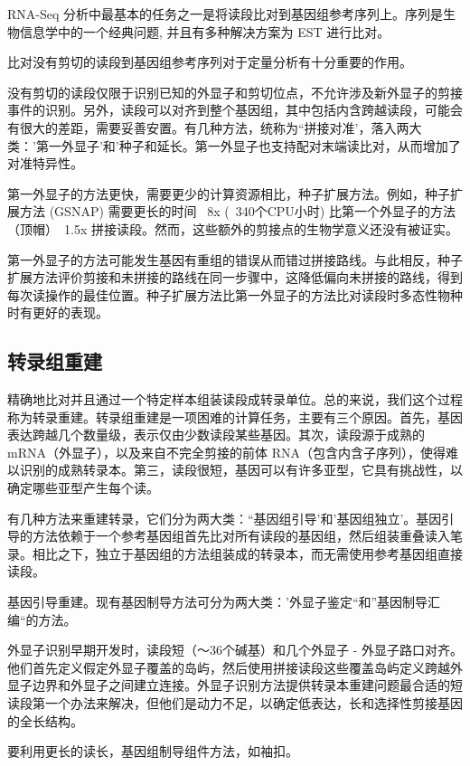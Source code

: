RNA-Seq 分析中最基本的任务之一是将读段比对到基因组参考序列上。序列是生物信息学中的一个经典问题, 并且有多种解决方案为 EST 进行比对。

比对没有剪切的读段到基因组参考序列对于定量分析有十分重要的作用。

没有剪切的读段仅限于识别已知的外显子和剪切位点，不允许涉及新外显子的剪接事件的识别。另外，读段可以对齐到整个基因组，其中包括内含跨越读段，可能会有很大的差距，需要妥善安置。有几种方法，统称为“拼接对准'，落入两大类：'第一外显子'和'种子和延长。第一外显子也支持配对末端读比对，从而增加了对准特异性。

第一外显子的方法更快，需要更少的计算资源相比，种子扩展方法。例如，种子扩展方法 (GSNAP) 需要更长的时间 ~8x (~340个CPU小时) 比第一个外显子的方法（顶帽）~1.5x 拼接读段。然而，这些额外的剪接点的生物学意义还没有被证实。

第一外显子的方法可能发生基因有重组的错误从而错过拼接路线。与此相反，种子扩展方法评价剪接和未拼接的路线在同一步骤中，这降低偏向未拼接的路线，得到每次读操作的最佳位置。种子扩展方法比第一外显子的方法比对读段时多态性物种时有更好的表现。

\subsection{转录组重建}

精确地比对并且通过一个特定样本组装读段成转录单位。总的来说，我们这个过程称为转录重建。转录组重建是一项困难的计算任务，主要有三个原因。首先，基因表达跨越几个数量级，表示仅由少数读段某些基因。其次，读段源于成熟的 mRNA（外显子），以及来自不完全剪接的前体 RNA（包含内含子序列），使得难以识别的成熟转录本。第三，读段很短，基因可以有许多亚型，它具有挑战性，以确定哪些亚型产生每个读。

有几种方法来重建转录，它们分为两大类：“基因组引导'和'基因组独立'。基因引导的方法依赖于一个参考基因组首先比对所有读段的基因组，然后组装重叠读入笔录。相比之下，独立于基因组的方法组装成的转录本，而无需使用参考基因​​组直接读段。

基因引导重建。现有基因制导方法可分为两大类：'外显子鉴定“和”基因制导汇编“的方法。

外显子识别早期开发时，读段短（〜36个碱基）和几个外显子 - 外显子路口对齐。他们首先定义假定外显子覆盖的岛屿，然后使用拼接读段这些覆盖岛屿定义跨越外显子边界和外显子之间建立连接。外显子识别方法提供转录本重建问题最合适的短读段第一个办法来解决，但他们是动力不足，以确定低表达，长和选择性剪接基因的全长结构。

要利用更长的读长，基因组制导组件方法，如袖扣。

